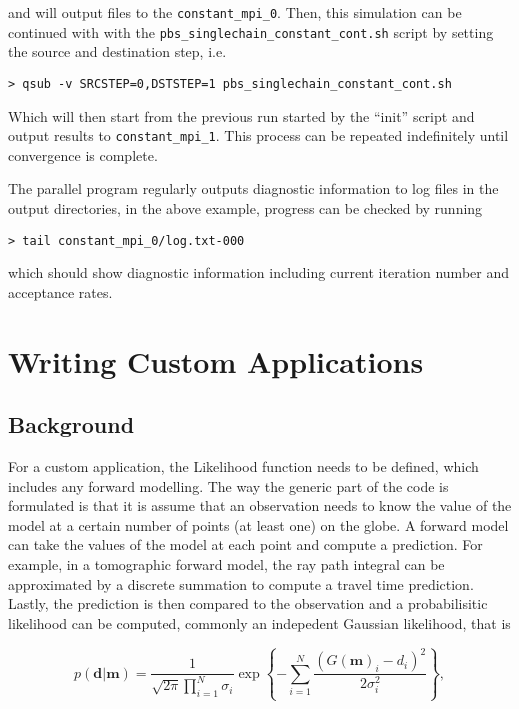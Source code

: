 \documentclass{article}
\begin{document}
and will output files to the {\tt constant\_mpi\_0}. Then, this
simulation can be continued with with the {\tt pbs\_singlechain\_constant\_cont.sh}
script by setting the source and destination step, i.e.

\begin{verbatim}
> qsub -v SRCSTEP=0,DSTSTEP=1 pbs_singlechain_constant_cont.sh
\end{verbatim}

Which will then start from the previous run started by the ``init'' script and
output results to {\tt constant\_mpi\_1}. This process can be repeated indefinitely
until convergence is complete.

The parallel program regularly outputs diagnostic information to log files in the
output directories, in the above example, progress can be checked by running

\begin{verbatim}
> tail constant_mpi_0/log.txt-000
\end{verbatim}

which should show diagnostic information including current iteration number and
acceptance rates.

\section{Writing Custom Applications}

\subsection{Background}

For a custom application, the Likelihood function needs to be defined, which
includes any forward modelling. The way the generic part of the code is formulated
is that it is assume that an observation needs to know the value of the model
at a certain number of points (at least one) on the globe. A forward model
can take the values of the model at each point and compute a prediction. For
example, in a tomographic forward model, the ray path integral can be approximated by a discrete
summation to compute a travel time prediction. Lastly, the prediction is then
compared to the observation and a probabilisitic likelihood can be computed, commonly
an indepedent Gaussian likelihood, that is

\begin{equation}
  p(\mathbf{d}|\mathbf{m}) = \frac{1}{\sqrt{2 \pi} \prod_{i=1}^N \sigma_i} \exp \left\{
  - \sum_{i = 1}^N \frac{(G(\mathbf{m})_i - d_i)^2}{2\sigma_i^2} \right\}
    ,
\end{equation}
\end{document}
